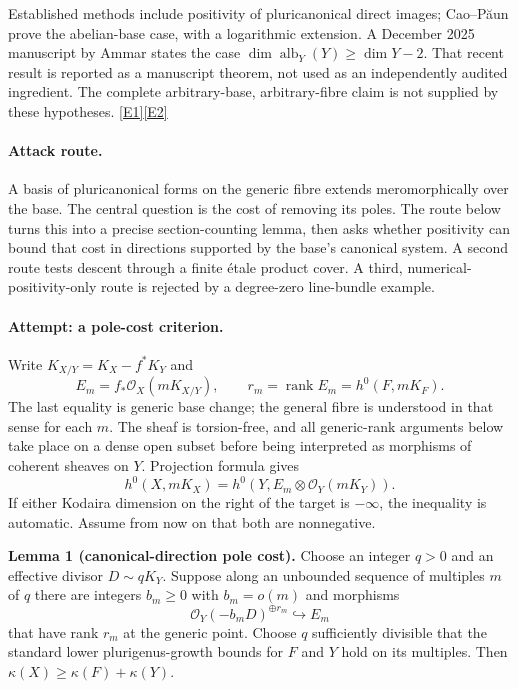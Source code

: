 \documentclass[11pt,a4paper]{article}
\newcommand{\eref}[2]{\hyperlink{extra:#1:#2}{[E#2]}}
\numberwithin{equation}{section}
\begin{document}
Established methods include positivity of pluricanonical direct images;
Cao--P\u{a}un prove the abelian-base case, with a logarithmic extension.
A December 2025 manuscript by Ammar states the case
$\dim\operatorname{alb}_Y(Y)\geq\dim Y-2$. That recent result is reported
as a manuscript theorem, not used as an independently audited ingredient.
The complete arbitrary-base, arbitrary-fibre claim is not supplied by
these hypotheses. \eref{30005168}{1}\eref{30005168}{2}

\paragraph{Attack route.}
A basis of pluricanonical forms on the generic fibre extends meromorphically
over the base. The central question is the cost of removing its poles.
The route below turns this into a precise section-counting lemma, then
asks whether positivity can bound that cost in directions supported by
the base's canonical system. A second route tests descent through a
finite \'etale product cover. A third, numerical-positivity-only route is
rejected by a degree-zero line-bundle example.

\paragraph{Attempt: a pole-cost criterion.}
Write $K_{X/Y}=K_X-f^*K_Y$ and
\[
 E_m=f_*\mathcal O_X(mK_{X/Y}),\qquad
 r_m=\operatorname{rank}E_m=h^0(F,mK_F).
\]
The last equality is generic base change; the general fibre is understood
in that sense for each $m$. The sheaf is torsion-free, and all generic-rank
arguments below take place on a dense open subset before being interpreted
as morphisms of coherent sheaves on $Y$. Projection formula gives
\begin{equation}\label{eq:30005168:projection}
 h^0(X,mK_X)=h^0(Y,E_m\otimes\mathcal O_Y(mK_Y)).
\end{equation}
If either Kodaira dimension on the right of the target is $-\infty$, the
inequality is automatic. Assume from now on that both are nonnegative.

\textbf{Lemma 1 (canonical-direction pole cost).}
Choose an integer $q>0$ and an effective divisor $D\sim qK_Y$.
Suppose along an unbounded sequence of multiples $m$ of $q$ there are
integers $b_m\geq0$ with $b_m=o(m)$ and morphisms
\begin{equation}\label{eq:30005168:injection}
 \mathcal O_Y(-b_mD)^{\oplus r_m}\hookrightarrow E_m
\end{equation}
that have rank $r_m$ at the generic point. Choose $q$ sufficiently divisible
that the standard lower plurigenus-growth bounds for $F$ and $Y$ hold on
its multiples. Then $\kappa(X)\geq\kappa(F)+\kappa(Y)$.
\end{document}
